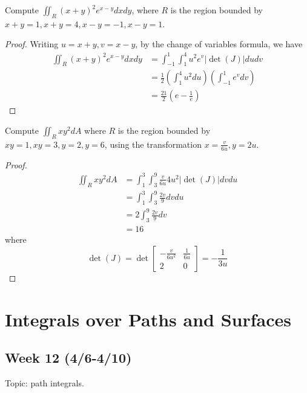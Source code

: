 \documentclass[openany]{book}
\begin{document}
\begin{prob}
    Compute $\iint_R(x+y)^2e^{x-y}dxdy$, where $R$ is the region bounded by $x+y=1, x+y=4, x-y=-1, x-y=1$.
\end{prob}
\begin{proof}
    Writing $u=x+y, v=x-y$, by the change of variables formula, we have 
    \begin{align*}
        \iint_R(x+y)^2e^{x-y}dxdy&=\int_{-1}^1\int_1^4u^2e^{v}|\det(J)|dudv\\
        &=\frac{1}{2}\left(\int_1^4u^2du\right)\left(\int_{-1}^1e^vdv\right)\\
        &=\frac{21}{2}\left(e-\frac{1}{e}\right)
    \end{align*}
\end{proof}


\begin{prob}
    Compute $\iint_Rxy^2dA$ where $R$ is the region bounded by $xy=1, xy=3, y=2, y=6$, using the transformation $x=\frac{v}{6u}, y=2u$.
\end{prob}
\begin{proof}
    \begin{align*}
        \iint_Rxy^2dA&=\int_1^3\int_3^9\frac{v}{6u}4u^2|\det(J)|dvdu\\
        &=\int_1^3\int_3^9\frac{2v}{9}dvdu\\
        &=2\int_3^9\frac{2v}{9}dv\\
        &=16
    \end{align*}
    where 
    \begin{equation*}
        \det(J)=\det\begin{bmatrix}
            -\frac{v}{6u^2}&\frac{1}{6u}\\
            2&0
        \end{bmatrix}=-\frac{1}{3u}
    \end{equation*}
\end{proof}



\chapter{Integrals over Paths and Surfaces}
\section*{\centering Week 12 (4/6-4/10)}
Topic: path integrals.
\end{document}

